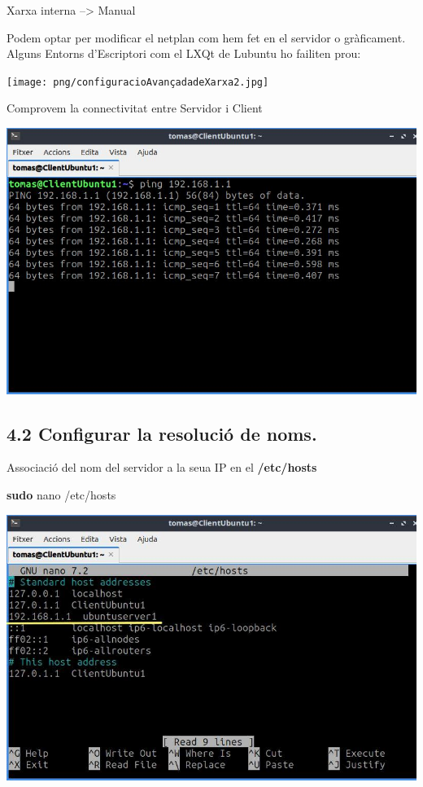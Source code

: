 \documentclass[
  12 pt,
  a4paper,
]{article}
\newenvironment{Shaded}{\begin{snugshade}}{\end{snugshade}}
\newcommand{\FunctionTok}[1]{\textcolor[rgb]{0.13,0.29,0.53}{\textbf{#1}}}
\newcommand{\NormalTok}[1]{#1}
\begin{document}
Xarxa interna --\textgreater{} Manual

Podem optar per modificar el netplan com hem fet en el servidor o
gràficament. Alguns Entorns d'Escriptori com el LXQt de Lubuntu ho
failiten prou:

\texttt{[image: png/configuracioAvançadadeXarxa2.jpg]}

Comprovem la connectivitat entre Servidor i Client

\includegraphics{png/pingIpServidor.jpg}

\subsection{4.2 Configurar la resolució de
noms.}\label{configurar-la-resoluciuxf3-de-noms.}

Associació del nom del servidor a la seua IP en el \textbf{/etc/hosts}

\begin{Shaded}
\begin{Highlighting}[]
\FunctionTok{sudo}\NormalTok{ nano /etc/hosts}
\end{Highlighting}
\end{Shaded}

\includegraphics{png/host.jpg}
\end{document}
